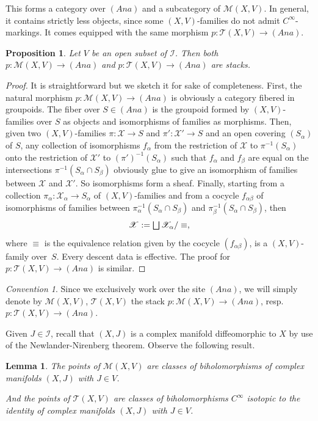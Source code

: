\documentclass[10pt]{amsart}
\let\mathcal\mathscr
\let\oldbigsqcup\bigsqcup
\renewcommand{\bigsqcup}{\mathop{\textstyle\oldbigsqcup}\displaylimits}
\newcommand{\Ana}{\mathit{Ana}}
\theoremstyle{plain}
\newtheorem{proposition}[theorem]{Proposition}
\newtheorem{lemma}[theorem]{Lemma}
\theoremstyle{definition}
\theoremstyle{remark}
\newtheorem{convention}[theorem]{Convention}
\numberwithin{equation}{section}
\newcommand{\cI}{\mathcal{I}}
\let\uniondisjointe\bigsqcup
\begin{document}
This forms a category over $(\Ana)$ and a subcategory of $\mathcal M(X,V)$. In general, it contains strictly less objects, since some $(X,V)$-families do not admit $C^\infty$-markings. It comes equipped with the same morphism $p : \mathcal T(X,V)\to (\Ana)$.

\begin{proposition}
\label{Theyarestacks}
Let $V$ be an open subset of $\cI$. Then both $p: \mathcal M(X,V)\to (\Ana)$ and $p: \mathcal T(X,V)\to (\Ana)$ are stacks.
\end{proposition}

\begin{proof}
It is straightforward but we sketch it for sake of completeness. First, the natural morphism $p:\mathcal M(X,V)\to(\Ana)$ is obviously a category fibered in groupoids. The fiber over $S\in(\Ana)$ is the groupoid formed by $(X,V)$-families over $S$ as \hbox{objects} and isomorphisms of families as morphisms. Then, given two $(X,V)$-families \hbox{$\pi : \mathcal X\to S$} and $\pi' : \mathcal X'\to S$ and an open covering $(S_\alpha)$ of $S$, any collection of isomorphisms $f_\alpha$ from the restriction of $\mathcal X$ to $\pi^{-1}(S_\alpha)$ onto the restriction of $\mathcal X'$ to $(\pi')^{-1}(S_\alpha)$ such that $f_\alpha$ and $f_\beta$ are equal on the intersections $\pi^{-1}(S_\alpha\cap S_\beta)$ obviously glue to give an isomorphism of families between $\mathcal X$ and $\mathcal X'$. So isomorphisms form a sheaf. Finally, starting from a collection $\pi_\alpha :\mathcal X_\alpha\to S_\alpha$ of $(X,V)$-families and from a cocycle $f_{\alpha\beta}$ of isomorphisms of families between $\pi^{-1}_\alpha (S_\alpha\cap S_\beta)$ and $\pi^{-1}_\beta (S_\alpha\cap S_\beta)$, then
\[
\mathcal X:=\uniondisjointe \mathcal X_\alpha/\equiv,
\]
where $\equiv$ is the equivalence relation given by the cocycle $(f_{\alpha\beta})$, is a $(X,V)$-family over~$S$. Every descent data is effective. The proof for $p:\mathcal T(X,V)\to (\Ana)$ is similar.
\end{proof}
\begin{convention}
Since we exclusively work over the site $(\Ana)$, we will simply denote by $\mathcal M(X,V)$, \resp $\mathcal T(X,V)$ the stack $p:\mathcal M(X,V)\to(\Ana)$, resp.\ \hbox{$p:\mathcal T(X,V)\to (\Ana)$}.
\end{convention}
Given $J\in\cI$, recall that $(X,J)$ is a complex manifold diffeomorphic to $X$ by use of the Newlander-Nirenberg theorem. Observe the following result.

\begin{lemma}
\label{stackspoints}
The points of $\mathcal M(X,V)$ are classes of biholomorphisms of complex manifolds $(X,J)$ with $J\in V$.

And the points of $\mathcal T(X,V)$ are classes of biholomorphisms $C^\infty$ isotopic to the identity of complex manifolds $(X,J)$ with $J\in V$.
\end{lemma}
\end{document}
